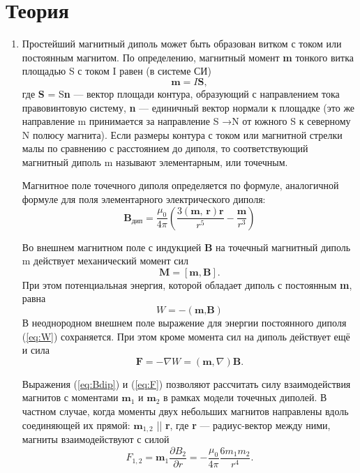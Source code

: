 \section{Теория}
\begin{enumerate}
    \item 


 Простейший магнитный диполь может быть образован витком с током или постоянным магнитом. По определению, магнитный момент \textbf{m}
тонкого витка площадью S с током I равен (в системе СИ)
\begin{equation}
    \textbf{m}=I\textbf{S},
    \label{eq:m}
\end{equation}
где \textbf{S} = S\textbf{n} — вектор площади контура, образующий с направлением тока правовинтовую систему, \textbf{n} — единичный вектор нормали к площадке
(это же направление m принимается за направление S →N от южного S к северному N полюсу магнита). Если размеры контура с током
или магнитной стрелки малы по сравнению с расстоянием до диполя, то
соответствующий магнитный диполь m называют элементарным, или
точечным.

Магнитное поле точечного диполя определяется по формуле, аналогичной формуле для поля элементарного электрического диполя:
\begin{equation}
    \textbf{B}_{дип}=\frac{\mu_0}{4\pi} \left(\frac{3(\textbf{m, r})\textbf{r}}{r^5}-\frac{\textbf{m}}{r^3} \right)
    \label{eq:Bdip}
\end{equation}

Во внешнем магнитном поле с индукцией \textbf{B} на точечный магнитный
диполь m действует механический момент сил
\begin{equation}
    \textbf{M}=[\textbf{m},\textbf{B}].
    \label{eq:M}
\end{equation}
При этом потенциальная энергия, которой обладает диполь с постоянным \textbf{m}, равна
\begin{equation}
    W=-(\textbf{m,B})
    \label{eq:W}
\end{equation}
В неоднородном внешнем поле выражение для энергии постоянного
диполя (\ref{eq:W}) сохраняется. При этом кроме момента сил на диполь действует ещё и сила
\begin{equation}
    \textbf{F}=-\nabla W= (\textbf{m},\nabla)\textbf{B}.
    \label{eq:F}
\end{equation}

Выражения (\ref{eq:Bdip}) и (\ref{eq:F}) позволяют рассчитать силу взаимодействия магнитов с моментами $\textbf{m}_1$ и $\textbf{m}_2$ в рамках модели точечных диполей. В частном случае, когда моменты двух небольших магнитов направлены вдоль соединяющей их прямой: $\textbf{m}_{1,2}$ || \textbf{r}, где \textbf{r} — радиус-вектор между ними, магниты взаимодействуют с силой
\begin{equation}
    F_{1,2}=\textbf{m}_1\frac{\partial B_2}{\partial r}=-\frac{\mu_0}{4\pi}\frac{6m_1m_2}{r^4}.
    \label{eq:F||}
\end{equation}


\end{enumerate}
